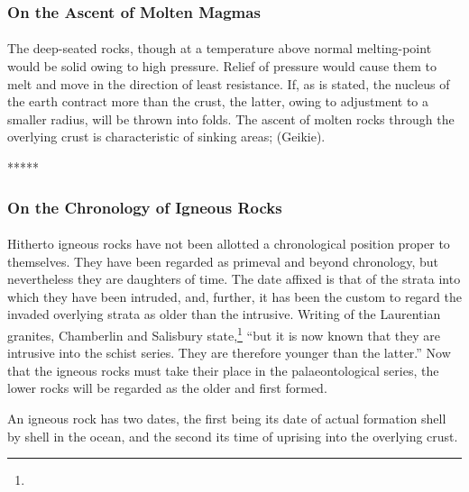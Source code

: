 \documentclass[a4paper, 12pt, oneside]{article}
\begin{document}
\subsubsection{On the Ascent of Molten Magmas}
\paragraph{}
The deep-seated rocks, though at a temperature above normal melting-point would be solid owing to high pressure. Relief of pressure would cause them to melt and move in the direction of least resistance. If, as is stated, the nucleus of the earth contract more than the crust, the latter, owing to adjustment to a smaller radius, will be thrown into folds. The ascent of molten rocks through the overlying crust is characteristic of sinking areas; (Geikie).

\centerline{*\hspace{15mm}*\hspace{15mm}*\hspace{15mm}*\hspace{15mm}*}
\bigskip

\subsubsection{On the Chronology of Igneous Rocks}
\paragraph{}
Hitherto igneous rocks have not been allotted a chronological position proper to themselves. They have been regarded as primeval and beyond chronology, but nevertheless they are daughters of time. The date affixed is that of the strata into which they have been intruded, and, further, it has been the custom to regard the invaded overlying strata as older than the intrusive. Writing of the Laurentian granites, Chamberlin and Salisbury state,\footnote{} ``but it is now known that they are intrusive into the schist series. They are therefore younger than the latter.'' Now that the igneous rocks must take their place in the palaeontological series, the lower rocks will be regarded as the older and first formed.

An igneous rock has two dates, the first being its date of actual formation shell by shell in the ocean, and the second its time of uprising into the overlying crust.
\end{document}
